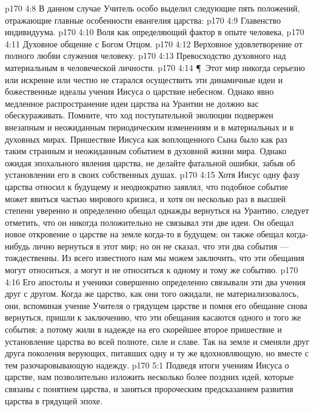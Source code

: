 \vs p170 4:8 В данном случае Учитель особо выделил следующие пять положений, отражающие главные особенности евангелия царства:
\vs p170 4:9 \bibnobreakspace Главенство индивидуума.
\vs p170 4:10 \bibnobreakspace Воля как определяющий фактор в опыте человека,
\vs p170 4:11 \bibnobreakspace Духовное общение с Богом Отцом.
\vs p170 4:12 \bibnobreakspace Верховное удовлетворение от полного любви служения человеку.
\vs p170 4:13 \bibnobreakspace Превосходство духовного над материальным в человеческой личности.
\vs p170 4:14 \P\ Этот мир никогда серьезно или искренне или честно не старался осуществить эти динамичные идеи и божественные идеалы учения Иисуса о царствие небесном. Однако явно медленное распространение идеи царства на Урантии не должно вас обескураживать. Помните, что ход поступательной эволюции подвержен внезапным и неожиданным периодическим изменениям и в материальных и в духовных мирах. Пришествие Иисуса как воплощенного Сына было как раз таким странным и неожиданным событием в духовной жизни мира. Однако ожидая эпохального явления царства, не делайте фатальной ошибки, забыв об установлении его в своих собственных душах.
\vs p170 4:15 Хотя Иисус одну фазу царства относил к будущему и неоднократно заявлял, что подобное событие может явиться частью мирового кризиса, и хотя он несколько раз в высшей степени уверенно и определенно обещал однажды вернуться на Урантию, следует отметить, что он никогда положительно не связывал эти две идеи. Он обещал новое откровение о царстве на земле когда\hyp{}то в будущем; он также обещал когда\hyp{}нибудь лично вернуться в этот мир; но он не сказал, что эти два события --- тождественны. Из всего известного нам мы можем заключить, что эти обещания могут относиться, а могут и не относиться к одному и тому же событию.
\vs p170 4:16 Его апостолы и ученики совершенно определенно связывали эти два учения друг с другом. Когда же царство, как они того ожидали, не материализовалось, они, вспоминая учение Учителя о грядущем царстве и помня его обещание снова вернуться, пришли к заключению, что эти обещания касаются одного и того же события; а потому жили в надежде на его скорейшее второе пришествие и установление царства во всей полноте, силе и славе. Так на земле и сменяли друг друга поколения верующих, питавших одну и ту же вдохновляющую, но вместе с тем разочаровывающую надежду.
\vs p170 5:1 Подведя итоги учениям Иисуса о царстве, нам позволительно изложить несколько более поздних идей, которые связаны с понятием царства, и заняться пророческим предсказанием развития царства в грядущей эпохе.
